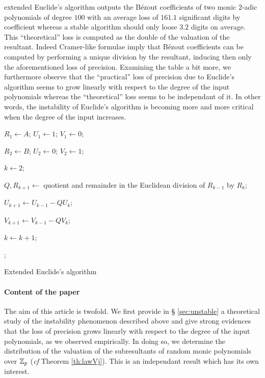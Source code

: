 \documentclass{article}
\begin{document}
extended Euclide's algorithm outputs the B\'ezout coefficients of two 
monic $2$-adic polynomials of degree $100$ with an average loss of 
$161.1$ significant digits by coefficient whereas a stable 
algorithm should only loose $3.2$ digits on average. This 
``theoretical'' loss is computed as the double of the valuation of the 
resultant. Indeed Cramer-like formulae imply that B\'ezout coefficients 
can be computed by performing a unique division by the resultant, 
inducing then only the aforementioned loss of precision. Examining the 
table a bit more, we furthermore observe that the ``practical'' loss of 
precision due to Euclide's algorithm seems to grow linearly with respect 
to the degree of the input polynomials whereas the ``theoretical'' loss 
seems to be independant of it. In other words, the instability of 
Euclide's algorithm is becoming more and more critical when the degree 
of the input increases.
%
\begin{algorithm}

  \BlankLine

  $R_1 \leftarrow A$; $U_1 \leftarrow 1$; $V_1 \leftarrow 0$;

  $R_2 \leftarrow B$; $U_2 \leftarrow 0$; $V_2 \leftarrow 1$;

  $k \leftarrow 2$;

    {$Q, R_{k+1} \leftarrow$ quotient and remainder in the Euclidean
     division of $R_{k-1}$ by $R_k$;

     $U_{k+1} \leftarrow U_{k-1} - Q U_k$;

     $V_{k+1} \leftarrow V_{k-1} - Q V_k$;

     $k \leftarrow k+1$;}

  ;
\caption{Extended Euclide's algorithm}
\label{algo:Euclide}
\end{algorithm}

\paragraph{Content of the paper}

The aim of this article is twofold. We first provide in \S 
\ref{sec:unstable} a theoretical study of the instability phenomenon 
described above and give strong evidences that the loss of precision 
grows linearly with respect to the degree of the input polynomials, as we 
observed empirically. In doing so, we determine the distribution of the 
valuation of the subresultants of random monic polynomials over $\mathbb Z_p$ 
(\emph{cf} Theorem \ref{th:lawVj}). This is an independant result which 
has its own interest.
\end{document}

